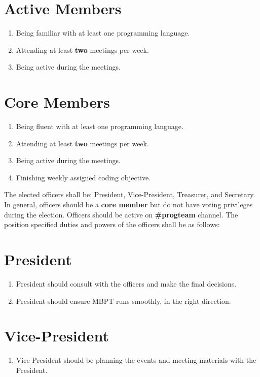 \documentclass[20pt]{constitution}
\begin{document}
\section{Active Members}
\begin{enumerate} 
    \item Being familiar with at least one programming language.
    \item Attending at least {\bf two} meetings per week.
    \item Being active during the meetings.
\end{enumerate}
\section{Core Members}
\begin{enumerate} 
    \item Being fluent with at least one programming language.
    \item Attending at least {\bf two} meetings per week.
    \item Being active during the meetings.
    \item Finishing weekly assigned coding objective.
\end{enumerate}

The elected officers shall be: President, Vice-President, Treasurer, and Secretary.
In general, officers should be a {\bf core member} but do not have voting privileges during the election. 
Officers should be active on {\bf \#progteam} channel.
The position specified duties and powers of the officers shall be as follows:

\section{President}
\begin{enumerate}
    \item President should consult with the officers and make the final decisions.
    \item President should ensure MBPT runs smoothly, in the right direction. 
\end{enumerate}

\section{Vice-President}
\begin{enumerate}
    \item Vice-President should be planning the events and meeting materials with the President.
\end{enumerate}
\end{document}
